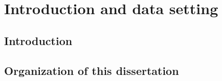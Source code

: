 \chapter{Introduction and data setting}
\label{chap:introduction}

\section{Introduction}
\label{sec:introduction}

\section{Organization of this dissertation}
\label{sec:organization}